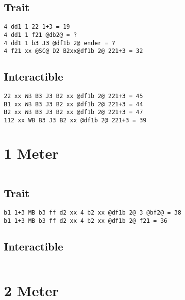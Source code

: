 \documentclass[main.tex]{subfiles}
\begin{document}
\subsection{Trait}

\begin{lstlisting}[language=FG]
4 dd1 1 22 1+3 = 19
4 dd1 1 f21 @db2@ = ?
4 dd1 1 b3 J3 @df1b 2@ ender = ?
4 f21 xx @SC@ D2 B2xx@df1b 2@ 221+3 = 32
\end{lstlisting}


\subsection{Interactible}
\begin{lstlisting}[language=FG]
22 xx WB B3 J3 B2 xx @df1b 2@ 221+3 = 45
B1 xx WB B3 J3 B2 xx @df1b 2@ 221+3 = 44
B2 xx WB B3 J3 B2 xx @df1b 2@ 221+3 = 47
112 xx WB B3 J3 B2 xx @df1b 2@ 221+3 = 39
\end{lstlisting}

\section{1 Meter}


\begin{lstlisting}[language=FG]
\end{lstlisting}

\subsection{Trait}
\begin{lstlisting}[language=FG]
b1 1+3 MB b3 ff d2 xx 4 b2 xx @df1b 2@ 3 @bf2@ = 38
b1 1+3 MB b3 ff d2 xx 4 b2 xx @df1b 2@ f21 = 36 
\end{lstlisting}


\subsection{Interactible}
\begin{lstlisting}[language=FG]

\end{lstlisting}

\section{2 Meter}


\begin{lstlisting}[language=FG]
\end{lstlisting}
\end{document}
